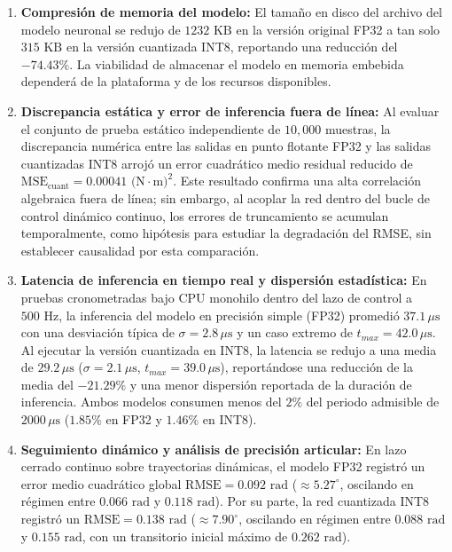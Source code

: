 \documentclass[12pt]{article}
\begin{document}
\begin{enumerate}
    \item \textbf{Compresión de memoria del modelo:} El tamaño en disco del archivo del modelo neuronal se redujo de $1232\text{ KB}$ en la versión original FP32 a tan solo $315\text{ KB}$ en la versión cuantizada INT8, reportando una reducción del \textbf{$-74.43\%$}. La viabilidad de almacenar el modelo en memoria embebida dependerá de la plataforma y de los recursos disponibles.
    \item \textbf{Discrepancia estática y error de inferencia fuera de línea:} Al evaluar el conjunto de prueba estático independiente de $10,000$ muestras, la discrepancia numérica entre las salidas en punto flotante FP32 y las salidas cuantizadas INT8 arrojó un error cuadrático medio residual reducido de $\text{MSE}_{\text{cuant}} = 0.00041\text{ (N}\cdot\text{m})^2$. Este resultado confirma una alta correlación algebraica fuera de línea; sin embargo, al acoplar la red dentro del bucle de control dinámico continuo, los errores de truncamiento se acumulan temporalmente, como hipótesis para estudiar la degradación del RMSE, sin establecer causalidad por esta comparación.
    \item \textbf{Latencia de inferencia en tiempo real y dispersión estadística:} En pruebas cronometradas bajo CPU monohilo dentro del lazo de control a $500\text{ Hz}$, la inferencia del modelo en precisión simple (FP32) promedió $37.1\,\mu\text{s}$ con una desviación típica de $\sigma = 2.8\,\mu\text{s}$ y un caso extremo de $t_{max} = 42.0\,\mu\text{s}$. Al ejecutar la versión cuantizada en INT8, la latencia se redujo a una media de \textbf{$29.2\,\mu\text{s}$} ($\sigma = 2.1\,\mu\text{s}$, $t_{max} = 39.0\,\mu\text{s}$), reportándose una reducción de la media del \textbf{$-21.29\%$} y una menor dispersión reportada de la duración de inferencia. Ambos modelos consumen menos del $2\%$ del periodo admisible de $2000\,\mu\text{s}$ ($1.85\%$ en FP32 y $1.46\%$ en INT8).
    \item \textbf{Seguimiento dinámico y análisis de precisión articular:} En lazo cerrado continuo sobre trayectorias dinámicas, el modelo FP32 registró un error medio cuadrático global $\text{RMSE} = 0.092\text{ rad}$ ($\approx 5.27^\circ$, oscilando en régimen entre $0.066\text{ rad}$ y $0.118\text{ rad}$). Por su parte, la red cuantizada INT8 registró un $\text{RMSE} = 0.138\text{ rad}$ ($\approx 7.90^\circ$, oscilando en régimen entre $0.088\text{ rad}$ y $0.155\text{ rad}$, con un transitorio inicial máximo de $0.262\text{ rad}$).
\end{enumerate}
\end{document}
